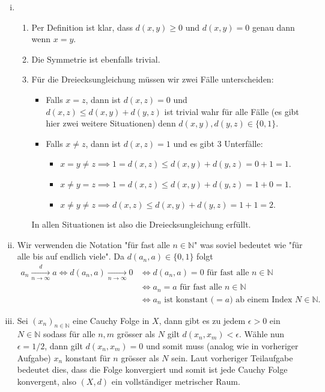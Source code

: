 \documentclass[a4paper, 20]{exam}
\begin{document}
\begin{solution}
\begin{enumerate}[i)]
\item 
\begin{enumerate}
\item Per Definition ist klar, dass $d(x,y) \geq 0$ und $d(x,y)=0$ genau dann wenn $x=y$.
\item Die Symmetrie ist ebenfalls trivial.
\item Für die Dreiecksungleichung müssen wir zwei Fälle unterscheiden: 
\begin{itemize}
\item Falls $x=z$, dann ist $d(x,z)=0$ und $d(x,z) \leq d(x,y)+d(y,z)$ ist trivial wahr für alle Fälle (es gibt hier zwei weitere Situationen) denn $d(x,y),d(y,z) \in \{0,1\}$.
\item Falls $x \neq z$, dann ist $d(x,z)=1$ und es gibt 3 Unterfälle:
\begin{itemize}
\item $x=y \neq z \implies 1=d(x,z) \leq d(x,y)+d(y,z) = 0+1=1$.
\item $x \neq y=z \implies 1=d(x,z) \leq d(x,y)+d(y,z) = 1+0 =1$.
\item $x \neq y \neq z \implies d(x,z) \leq d(x,y)+ d(y,z) = 1+1=2$. 
\end{itemize} 
\end{itemize}
In allen Situationen ist also die Dreiecksungleichung erfüllt. 
\end{enumerate}
\item Wir verwenden die Notation "für fast alle $n \in \mathbb{N}$" was soviel bedeutet wie "für alle bis auf endlich viele". Da $d(a_n,a) \in \{0,1\}$ folgt 
\begin{align*}
a_n \xrightarrow[n \to \infty]{d} a  \iff d(a_n,a) \xrightarrow[n\to \infty]{} 0 &\iff d(a_n,a)=0 \text{ für fast alle } n \in \mathbb{N} \\
& \iff a_n = a \text{ für fast alle }n \in \mathbb{N} \\
& \iff a_n \text{ ist konstant ($=a$) ab einem Index } N \in \mathbb{N}.
\end{align*}
\item Sei $(x_n)_{n \in \mathbb{N}}$ eine Cauchy Folge in $X$, dann gibt es zu jedem $\epsilon >0$ ein $N \in \mathbb{N}$ sodass für alle $n,m$ grösser als $N$ gilt $d(x_n,x_m) < \epsilon$. Wähle nun $\epsilon=1/2$, dann gilt $d(x_n,x_m)=0$ und somit muss (analog wie in vorheriger Aufgabe) $x_n$ konstant für $n$ grösser als $N$ sein. Laut vorheriger Teilaufgabe bedeutet dies, dass die Folge konvergiert und somit ist jede Cauchy Folge konvergent, also $(X,d)$ ein vollständiger metrischer Raum. 

\end{enumerate}
\end{solution}
\end{document}
